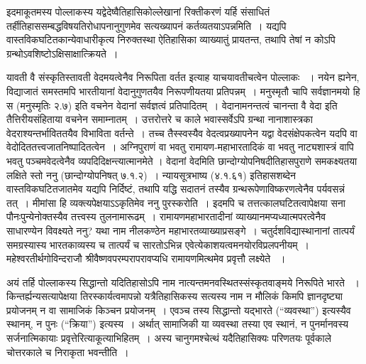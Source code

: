इदमाकूतमस्य पोल्लाकस्य यद्वेदेष्वैतिहासिकोल्लेखानां रिक्तीकरणं यर्हि संसाधितं तर्हीतिहाससम्बद्धविषयतिरोधापनानुगुणमेव सत्यख्यापनं कर्तव्यतयाऽपन्नमिति~। \break यद्यपि वास्तविकघटितकान्येवाधारीकृत्य निरुक्तस्था ऐतिहासिका व्याख्यातुं प्रायतन्त, तथापि तेषां न कोऽपि ग्रन्थोऽवशिष्टोऽक्षिसाक्षात्क्रियते~।

यावती वै संस्कृतिस्तावती वेदमयत्वेनैव निरूपिता वर्तत इत्याह याचयावतीचत्वेन पोल्लाकः ~। नयेन ह्यनेन, विद्याजातं समस्तमपि भारतीयानां वेदानुगुणतयैव निरूपणीयतया प्रतिपन्नम्~। मनुस्मृतौ चापि सर्वज्ञानमयो हि स (मनुस्मृतिः २.७) इति वचनेन वेदानां सर्वज्ञत्वं प्रतिपादितम्~। वेदानामनन्तत्वं चानन्ता वै वेदा इति तैत्तिरीयसंहिताया वचनेन  समाम्नातम्~। उत्तरोत्तरे च काले भवास्सर्वेऽपि ग्रन्था नानाशास्त्रका वेदराश्यन्तर्भाविततयैव विभाविता वर्तन्ते~। तच्च तैस्स्वस्यैव वेदत्वप्रख्यापनेन यद्वा वेदसंक्षेपकत्वेन यदपि वा वेदोदिततत्त्वजातनिष्पादितत्वेन~। अग्निपुराणं वा भवतु रामायण-महाभारतादिकं वा भवतु नाट्यशास्त्रं वापि भवतु पञ्चमवेदत्वेनैव व्यपदिदिक्षन्त्यात्मानमेते । वेदानां वेदमिति छान्दोग्योपनिषदीतिहासपुराणे समकक्ष्यतया लक्षिते स्तो ननु (छान्दोग्योपनिषत् ७.१.२)~। न्यायसूत्रभाष्य (४.१.६१) इतिहासशब्देन वास्तविकघटितजातमेव यद्यपि निर्दिष्टं, तथापि यद्धि सदातनं तस्यैव ग्रन्थरूपेणाविष्करणत्वेनैव पर्यवसन्नं तत्~। मीमांसा हि व्यक्त्यपेक्षयाऽऽकृतिमेव ननु पुरस्करोति~। इदमपि च तत्तत्कालघटितत्वापेक्षया सना पौनःपुन्येनोक्तस्यैव तत्त्वस्य तुलनामारूढम्~। रामायणमहाभारतादीनां व्याख्यानमप्यध्यात्मपरत्वेनैव साधारण्येन विवक्ष्यते ननु? यथा नाम नीलकण्ठेन महाभारतव्याख्याप्रसङ्गे~। चतुर्दशविद्यास्थानानां तात्पर्यं समग्रस्यास्य भारतकाव्यस्य च तात्पर्यं च सारतोऽभिन्न एवेत्येकाशयत्वमनयोरविप्रलपनीयम्~। महेश्वरतीर्थगोविन्दराजौ श्रीवैष्णवपरम्परापरावप्यधि रामायणमित्थमेव प्रवृत्तौ लक्ष्येते ~।

अयं तर्हि पोल्लाकस्य सिद्धान्तो यदितिहासोऽपि नाम नात्यन्तमनवस्थितस्संस्कृतवाङ्मये निरूपिते भारते ~। किन्तर्ह्यन्यसत्यापेक्षया तिरस्कार्यत्वमापन्नो यत्रैतिहासिकस्य सत्यस्य नाम न मौलिकं किमपि ज्ञानदृष्ट्या प्रयोजनम् न वा सामाजिकं किञ्चन प्रयोजनम्~। एवञ्च तस्य सिद्धान्तो यद्भारते  (“व्यवस्था”) इत्यस्यैव स्थानम्, न पुनः (“क्रिया”) इत्यस्य~। अर्थात् सामाजिकी या व्यवस्था तस्या एव स्थानं, न पुनर्मानवस्य सर्जनात्मिकायाः प्रवृत्तेरित्याकूत्याभिहितम्~। अस्य चानुगमश्चेत्थं यदैतिहासिक्यः परिणतयः  पूर्वकाले चोत्तरकाले च निराकृता भवन्तीति~।

